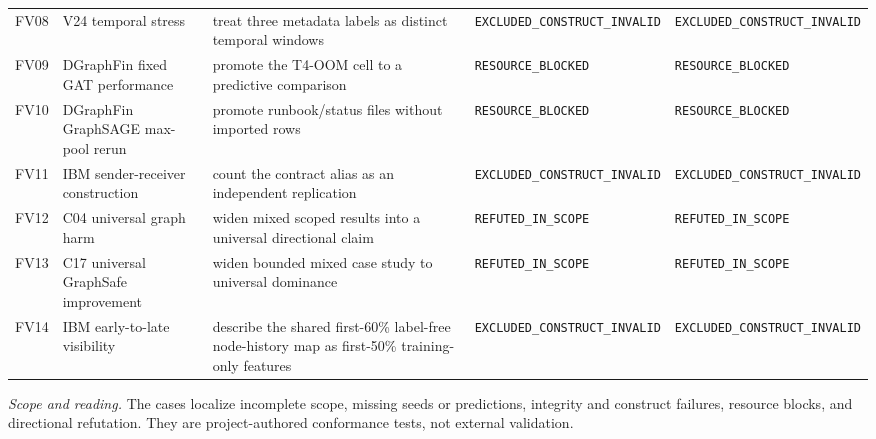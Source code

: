 \begin{longtable}{@{}p{} p{} p{} p{} p{}@{}}
FV08 & V24 temporal stress & treat three metadata labels as distinct temporal windows & \texttt{EXCLUDED\_\allowbreak{}CONSTRUCT\_\allowbreak{}INVALID} & \texttt{EXCLUDED\_\allowbreak{}CONSTRUCT\_\allowbreak{}INVALID} \\
FV09 & DGraphFin fixed GAT performance & promote the T4-OOM cell to a predictive comparison & \texttt{RESOURCE\_\allowbreak{}BLOCKED} & \texttt{RESOURCE\_\allowbreak{}BLOCKED} \\
FV10 & DGraphFin GraphSAGE max-pool rerun & promote runbook/status files without imported rows & \texttt{RESOURCE\_\allowbreak{}BLOCKED} & \texttt{RESOURCE\_\allowbreak{}BLOCKED} \\
FV11 & IBM sender-receiver construction & count the contract alias as an independent replication & \texttt{EXCLUDED\_\allowbreak{}CONSTRUCT\_\allowbreak{}INVALID} & \texttt{EXCLUDED\_\allowbreak{}CONSTRUCT\_\allowbreak{}INVALID} \\
FV12 & C04 universal graph harm & widen mixed scoped results into a universal directional claim & \texttt{REFUTED\_\allowbreak{}IN\_\allowbreak{}SCOPE} & \texttt{REFUTED\_\allowbreak{}IN\_\allowbreak{}SCOPE} \\
FV13 & C17 universal GraphSafe improvement & widen bounded mixed case study to universal dominance & \texttt{REFUTED\_\allowbreak{}IN\_\allowbreak{}SCOPE} & \texttt{REFUTED\_\allowbreak{}IN\_\allowbreak{}SCOPE} \\
FV14 & IBM early-to-late visibility & describe the shared first-60\% label-free node-history map as first-50\% training-only features & \texttt{EXCLUDED\_\allowbreak{}CONSTRUCT\_\allowbreak{}INVALID} & \texttt{EXCLUDED\_\allowbreak{}CONSTRUCT\_\allowbreak{}INVALID} \\
\end{longtable}
\noindent\footnotesize\emph{Scope and reading.} The cases localize incomplete scope, missing seeds or predictions, integrity and construct failures, resource blocks, and directional refutation. They are project-authored conformance tests, not external validation.\par
\endgroup
